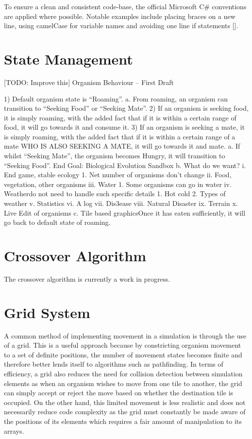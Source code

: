 \documentclass[a4paper, oneside, 11pt]{report}
\begin{document}
To ensure a clean and consistent code-base, the official Microsoft C\# conventions are applied where possible. Notable examples include placing braces on a new line, using camelCase for variable names and avoiding one line if statements [\cite{microsoft}].


\section{State Management}\label{statemanagement}
[TODO: Improve this]
Organism Behaviour – First Draft

1) Default organism state is “Roaming”.
a. From roaming, an organism can transition to “Seeking Food” or “Seeking Mate”.
2) If an organism is seeking food, it is simply roaming, with the added fact that if it is within a certain range of food, it will go towards it and consume it.
3) If an organism is seeking a mate, it is simply roaming, with the added fact that if it is within a certain range of a mate WHO IS ALSO SEEKING A MATE, it will go towards it and mate.
a. If whilst “Seeking Mate”, the organism becomes Hungry, it will transition to “Seeking Food”. End Goal: Biological Evolution Sandbox
b. What do we want?
i. End game, stable ecology
1. Net number of organisms don’t change
ii. Food, vegetation, other organisms
iii. Water
1. Some organisms can go in water
iv. Weatherdo not need to handle such specific details
1. Hot cold
2. Types of weather
v. Statistics
vi. A log
vii. Dis3ease
viii. Natural Disaster
ix. Terrain
x. Live Edit of organisms
c. Tile based graphicsOnce it has eaten sufficiently, it will go back to default state of roaming.

\section{Crossover Algorithm}\label{crossover}
The crossover algorithm is currently a work in progress.

\section{Grid System}\label{grid}
A common method of implementing movement in a simulation is through the use of a grid. This is a useful approach because by constricting organism movement to a set of definite positions, the number of movement states becomes finite and therefore better lends itself to algorithms such as pathfinding. In terms of efficiency, a grid also reduces the need for collision detection between simulation elements as when an organism wishes to move from one tile to another, the grid can simply accept or reject the move based on whether the destination tile is occupied. On the other hand, this limited movement is less realistic and does not necessarily reduce code complexity as the grid must constantly be made aware of the positions of its elements which requires a fair amount of manipulation to its arrays. 
\end{document}
